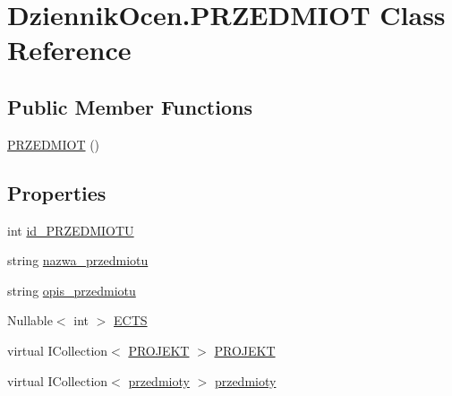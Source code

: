 \hypertarget{class_dziennik_ocen_1_1_p_r_z_e_d_m_i_o_t}{}\section{Dziennik\+Ocen.\+P\+R\+Z\+E\+D\+M\+I\+OT Class Reference}
\label{class_dziennik_ocen_1_1_p_r_z_e_d_m_i_o_t}
\subsection*{Public Member Functions}
\begin{DoxyCompactItemize}
\item 
\hyperlink{class_dziennik_ocen_1_1_p_r_z_e_d_m_i_o_t_a9cc64069d717b73d884cc651bd2533b8}{P\+R\+Z\+E\+D\+M\+I\+OT} ()
\end{DoxyCompactItemize}
\subsection*{Properties}
\begin{DoxyCompactItemize}
\item 
int \hyperlink{class_dziennik_ocen_1_1_p_r_z_e_d_m_i_o_t_acc4fd41b16cbce73deac5eed22dcaa2b}{id\+\_\+\+P\+R\+Z\+E\+D\+M\+I\+O\+TU}
\item 
string \hyperlink{class_dziennik_ocen_1_1_p_r_z_e_d_m_i_o_t_a7329b58c908c95e3f418136b1fdf5847}{nazwa\+\_\+przedmiotu}
\item 
string \hyperlink{class_dziennik_ocen_1_1_p_r_z_e_d_m_i_o_t_aa6e70fe702f933fbd438807d57fcc476}{opis\+\_\+przedmiotu}
\item 
Nullable$<$ int $>$ \hyperlink{class_dziennik_ocen_1_1_p_r_z_e_d_m_i_o_t_a8c85b30c913a14001536b494634104ea}{E\+C\+TS}
\item 
virtual I\+Collection$<$ \hyperlink{class_dziennik_ocen_1_1_p_r_o_j_e_k_t}{P\+R\+O\+J\+E\+KT} $>$ \hyperlink{class_dziennik_ocen_1_1_p_r_z_e_d_m_i_o_t_a063e4614e232eb30b3b10d5827856902}{P\+R\+O\+J\+E\+KT}
\item 
virtual I\+Collection$<$ \hyperlink{class_dziennik_ocen_1_1przedmioty}{przedmioty} $>$ \hyperlink{class_dziennik_ocen_1_1_p_r_z_e_d_m_i_o_t_ab8bbdf31a57590aff3786e6cf5d86d68}{przedmioty}
\end{DoxyCompactItemize}


